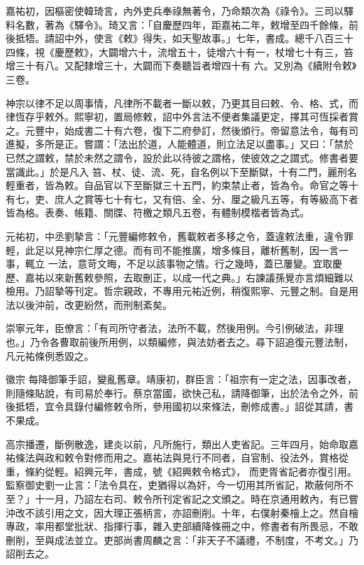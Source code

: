 \begin{pinyinscope}
 嘉祐初，因樞密使韓琦言，內外吏兵奉祿無著令，乃命類次為《祿令》。三司以驛料名數，著為《驛令》。琦又言：「自慶歷四年，距嘉祐二年，敕增至四千餘條，前後抵牾。請詔中外，使言《敕》得失，如天聖故事。」七年，書成。總千八百三十四條，視《慶歷敕》，大闢增六十，流增五十，徒增六十有一，杖增七十有三，笞增三十有八。又配隸增三十，大闢而下奏聽旨者增四十有
 六。又別為《續附令敕》三卷。



 神宗以律不足以周事情，凡律所不載者一斷以敕，乃更其目曰敕、令、格、式，而律恆存乎敕外。熙寧初，置局修敕，詔中外言法不便者集議更定，擇其可恆採者賞之。元豐中，始成書二十有六卷，復下二府參訂，然後頒行。帝留意法令，每有司進擬，多所是正。嘗謂：「法出於道，人能體道，則立法足以盡事。」又曰：「禁於已然之謂敕，禁於未然之謂令，設於此以待彼之謂格，使彼效之之謂式。修書者要當識此。」於是凡入
 笞、杖、徒、流、死，自名例以下至斷獄，十有二門，麗刑名輕重者，皆為敕。自品官以下至斷獄三十五門，約束禁止者，皆為令。命官之等十有七，吏、庶人之賞等七十有七，又有倍、全、分、厘之級凡五等，有等級高下者皆為格。表奏、帳籍、關牒、符檄之類凡五卷，有體制模楷者皆為式。



 元祐初，中丞劉摯言：「元豐編修敕令，舊載敕者多移之令，蓋違敕法重，違令罪輕，此足以見神宗仁厚之德。而有司不能推廣，增多條目，離析舊制，因一言一事，輒立
 一法，意苛文晦，不足以該事物之情。行之幾時，蓋已屢變。宜取慶歷、嘉祐以來新舊敕參照，去取刪正，以成一代之典。」右諫議孫覺亦言煩細難以檢用。乃詔摯等刊定。哲宗親政，不專用元祐近例，稍復熙寧、元豐之制。自是用法以後沖前，改更紛然，而刑制紊矣。



 崇寧元年，臣僚言：「有司所守者法，法所不載，然後用例。今引例破法，非理也。」乃令各曹取前後所用例，以類編修，與法妨者去之。尋下詔追復元豐法制，凡元祐條例悉毀之。



 徽宗
 每降御筆手詔，變亂舊章。靖康初，群臣言：「祖宗有一定之法，因事改者，則隨條貼說，有司易於奉行。蔡京當國，欲快己私，請降御筆，出於法令之外，前後抵牾，宜令具錄付編修敕令所，參用國初以來條法，刪修成書。」詔從其請，書不果成。



 高宗播遷，斷例散逸，建炎以前，凡所施行，類出人吏省記。三年四月，始命取嘉祐條法與政和敕令對修而用之。嘉祐法與見行不同者，自官制、役法外，賞格從重，條約從輕。紹興元年，書成，號《紹興敕令格式》，
 而吏胥省記者亦復引用。監察御史劉一止言：「法令具在，吏猶得以為奸，今一切用其所省記，欺蔽何所不至？」十一月，乃詔左右司、敕令所刊定省記之文頒之。時在京通用敕內，有已嘗沖改不該引用之文，因大理正張柄言，亦詔刪削。十年，右僕射秦檜上之。然自檜專政，率用都堂批狀、指揮行事，雜入吏部續降條冊之中，修書者有所畏忌，不敢刪削，至與成法並立。吏部尚書周麟之言：「非天子不議禮，不制度，不考文。」乃詔削去之。




\end{pinyinscope}
